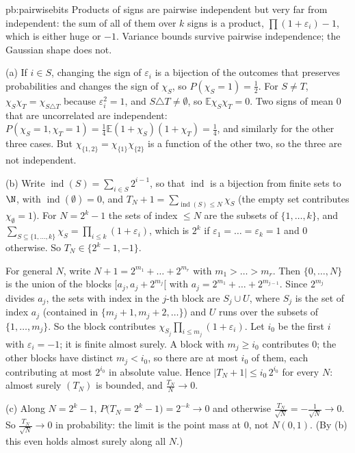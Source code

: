 \begin{solution}{pb:pairwisebits}
\idea Products of signs are pairwise independent but very far from independent: the sum of all of them over $k$ signs is a product, $\prod(1+\varepsilon_i)-1$,
which is either huge or $-1$. Variance bounds survive pairwise independence; the Gaussian shape does not.

\writeup (a) If $i\in S$, changing the sign of $\varepsilon_i$ is a bijection of the outcomes that preserves probabilities and changes the sign of $\chi_S$, so
$P(\chi_S=1)=\frac12$. For $S\ne T$, $\chi_S\chi_T=\chi_{S\triangle T}$ because $\varepsilon_i^2=1$, and $S\triangle T\ne\emptyset$, so $\mathbb E\chi_S\chi_T=0$. Two signs of
mean $0$ that are uncorrelated are independent: $P(\chi_S=1,\chi_T=1)=\frac14\mathbb E(1+\chi_S)(1+\chi_T)=\frac14$, and similarly for the other three cases. But
$\chi_{\{1,2\}}=\chi_{\{1\}}\chi_{\{2\}}$ is a function of the other two, so the three are not independent.

(b) Write $\operatorname{ind}(S)=\sum_{i\in S}2^{i-1}$, so that $\operatorname{ind}$ is a bijection from finite sets to $\N$, with $\operatorname{ind}(\emptyset)=0$, and
$T_N+1=\sum_{\operatorname{ind}(S)\le N}\chi_S$ (the empty set contributes $\chi_\emptyset=1$). For $N=2^k-1$ the sets of index $\le N$ are the subsets of $\{1,\dots,k\}$, and
$\sum_{S\subseteq\{1,\dots,k\}}\chi_S=\prod_{i\le k}(1+\varepsilon_i)$, which is $2^k$ if $\varepsilon_1=\dots=\varepsilon_k=1$ and $0$ otherwise. So $T_N\in\{2^k-1,-1\}$.

For general $N$, write $N+1=2^{m_1}+\dots+2^{m_r}$ with $m_1>\dots>m_r$. Then $\{0,\dots,N\}$ is the union of the blocks $[a_j,a_j+2^{m_j}[$ with
$a_j=2^{m_1}+\dots+2^{m_{j-1}}$. Since $2^{m_j}$ divides $a_j$, the sets with index in the $j$-th block are $S_j\cup U$, where $S_j$ is the set of index $a_j$ (contained in
$\{m_j+1,m_j+2,\dots\}$) and $U$ runs over the subsets of $\{1,\dots,m_j\}$. So the block contributes $\chi_{S_j}\prod_{i\le m_j}(1+\varepsilon_i)$. Let $i_0$ be the first $i$
with $\varepsilon_i=-1$; it is finite almost surely. A block with $m_j\ge i_0$ contributes $0$; the other blocks have distinct $m_j<i_0$, so there are at most $i_0$ of them,
each contributing at most $2^{i_0}$ in absolute value. Hence $|T_N+1|\le i_0\,2^{i_0}$ for every $N$: almost surely $(T_N)$ is bounded, and $\frac{T_N}N\to0$.

(c) Along $N=2^k-1$, $P\bigl(T_N=2^k-1\bigr)=2^{-k}\to0$ and otherwise $\frac{T_N}{\sqrt N}=-\frac1{\sqrt N}\to0$. So $\frac{T_N}{\sqrt N}\to0$ in probability: the limit is the
point mass at $0$, not $N(0,1)$. (By (b) this even holds almost surely along all $N$.)


\end{solution}
